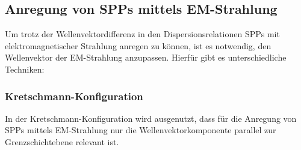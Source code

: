 \documentclass[a4paper, titlepage,  ngerman]{book}
\begin{document}
	\subsection{Anregung von SPPs mittels EM-Strahlung}
	\label{sec:exictation}
	Um trotz der Wellenvektordifferenz in den Dispersionsrelationen SPPs mit elektromagnetischer Strahlung anregen zu können, ist es notwendig, den Wellenvektor der EM-Strahlung anzupassen. Hierfür gibt es unterschiedliche Techniken:
	\subsubsection{Kretschmann-Konfiguration}
	In der Kretschmann-Konfiguration wird ausgenutzt, dass für die Anregung von SPPs mittels EM-Strahlung nur die Wellenvektorkomponente parallel zur Grenzschichtebene relevant ist. 
		
\end{document}
